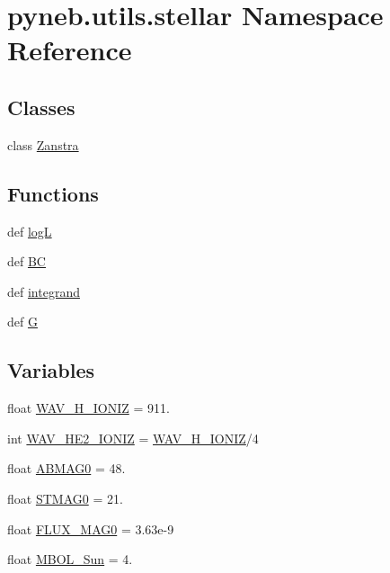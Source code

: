 \hypertarget{namespacepyneb_1_1utils_1_1stellar}{\section{pyneb.\-utils.\-stellar Namespace Reference}
\label{namespacepyneb_1_1utils_1_1stellar}
}
\subsection*{Classes}
\begin{DoxyCompactItemize}
\item 
class \hyperlink{classpyneb_1_1utils_1_1stellar_1_1_zanstra}{Zanstra}
\end{DoxyCompactItemize}
\subsection*{Functions}
\begin{DoxyCompactItemize}
\item 
def \hyperlink{namespacepyneb_1_1utils_1_1stellar_a1028b99ddfc374c050254672a26abda9}{log\-L}
\item 
def \hyperlink{namespacepyneb_1_1utils_1_1stellar_adb31507adc6104012e696b5d0b28b2cc}{B\-C}
\item 
def \hyperlink{namespacepyneb_1_1utils_1_1stellar_adf2a28268f7e69307f7b6c47920bcbb2}{integrand}
\item 
def \hyperlink{namespacepyneb_1_1utils_1_1stellar_ab168636a519c17879ce58df1188ddbe1}{G}
\end{DoxyCompactItemize}
\subsection*{Variables}
\begin{DoxyCompactItemize}
\item 
float \hyperlink{namespacepyneb_1_1utils_1_1stellar_a3b08012da140f22a1eae2f67e76e4fcb}{W\-A\-V\-\_\-\-H\-\_\-\-I\-O\-N\-I\-Z} = 911.
\item 
int \hyperlink{namespacepyneb_1_1utils_1_1stellar_a1a835c0f9e5358c4429341c9dde6136a}{W\-A\-V\-\_\-\-H\-E2\-\_\-\-I\-O\-N\-I\-Z} = \hyperlink{namespacepyneb_1_1utils_1_1stellar_a3b08012da140f22a1eae2f67e76e4fcb}{W\-A\-V\-\_\-\-H\-\_\-\-I\-O\-N\-I\-Z}/4
\item 
float \hyperlink{namespacepyneb_1_1utils_1_1stellar_a0ea378d70a17ed2cc96e376adb38d088}{A\-B\-M\-A\-G0} = 48.
\item 
float \hyperlink{namespacepyneb_1_1utils_1_1stellar_ad1eff0010bbf25e2217f1e032b977776}{S\-T\-M\-A\-G0} = 21.
\item 
float \hyperlink{namespacepyneb_1_1utils_1_1stellar_a0354ae64b0e6f25abe4a2885eb1a4e8e}{F\-L\-U\-X\-\_\-\-M\-A\-G0} = 3.\-63e-\/9
\item 
float \hyperlink{namespacepyneb_1_1utils_1_1stellar_ab18debf6c3703f938553e9fcc2211532}{M\-B\-O\-L\-\_\-\-Sun} = 4.
\end{DoxyCompactItemize}


